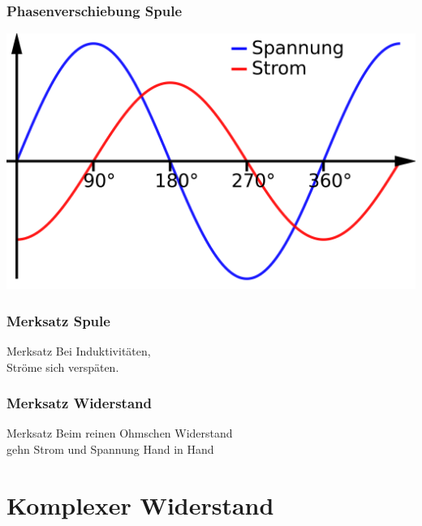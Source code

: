 \begin{frame}
  \frametitle{Phasenverschiebung Spule}
  \begin{center}
    \includegraphics[width=1\textwidth,height=.85\textheight,keepaspectratio]{a03/Phasenverschiebung_induktiv.png}
    \tiny \hyperlink{refs}{\cite{wc}}
  \end{center}
\end{frame}

\begin{frame}
  \frametitle{Merksatz Spule}
  \begin{block}{Merksatz}
    Bei Induktivitäten,\\
    Ströme sich verspäten.
  \end{block}
\end{frame}

\begin{frame}
  \frametitle{Merksatz Widerstand}
  \begin{block}{Merksatz}
    Beim reinen Ohmschen Widerstand\\
    gehn Strom und Spannung Hand in Hand
  \end{block}
\end{frame}

\section*{Komplexer Widerstand}

